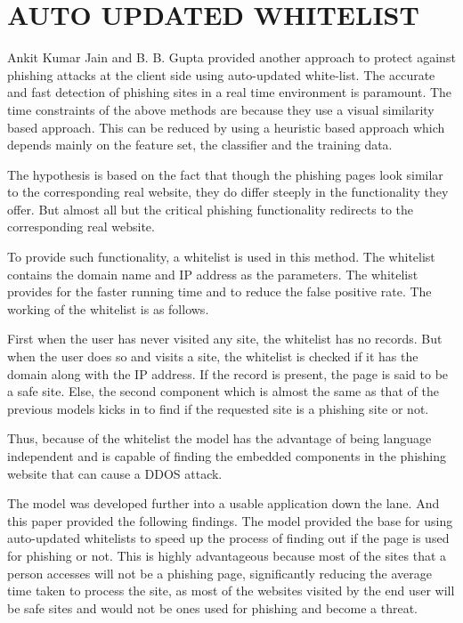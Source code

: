 \section{AUTO UPDATED WHITELIST}
Ankit Kumar Jain and B. B. Gupta provided another approach to protect against phishing attacks at the client side using auto-updated white-list. The accurate and fast detection of phishing sites in a real time environment is paramount. The time constraints of the above methods are because they use a visual similarity based approach. This can be reduced by using a heuristic based  approach which depends mainly on the feature set, the classifier and the training data. 

The hypothesis is based on the fact that though the phishing pages look similar to the corresponding real website, they do differ steeply in the functionality they offer. But almost all but the critical phishing functionality redirects to the corresponding real website.

To provide such functionality, a whitelist is used in this method. The whitelist contains the domain name and IP address as the parameters. The whitelist provides for the faster running time and to reduce the false positive rate. The working of the whitelist is as follows.

First when the user has never visited any site, the whitelist has no records. But when the user does so and visits a site, the whitelist is checked if it has the domain along with the IP address. If the record is present, the page is said to be a safe site. Else, the second component which is almost the same as that of the previous models kicks in to find if the requested site is a phishing site or not.

Thus, because of the whitelist the model has the advantage of being language independent and is capable of finding the embedded components in the phishing website that can cause a DDOS attack.

The model was developed further into a usable application down the lane. And this paper provided the following findings. The model provided the base for using auto-updated whitelists to speed up the process of finding out if the page is used for phishing or not. This is highly advantageous because most of the sites that a person accesses will not be a phishing page, significantly reducing the average time taken to process the site, as most of the websites visited by the end user will be safe sites and would not be ones used for phishing and become a threat. 

